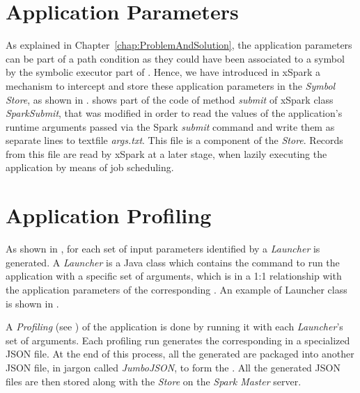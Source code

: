 \section{Application Parameters}\label{sec:application_parameters}
As explained in Chapter~\ref{chap:ProblemAndSolution}, the application parameters can be part of a path condition as they could have been associated to a symbol by the symbolic executor part of \dSymb. Hence, we have introduced in xSpark a mechanism to intercept and store these application parameters in the \tool \textit{Symbol Store}, as shown in .   shows part of the code of method \textit{submit} of xSpark class \textit{SparkSubmit}, that was modified in order to read the values of the application's runtime arguments passed via the Spark \textit{submit} command and write them as separate lines to textfile \textit{args.txt}. This file is a component of the \textit{\model Store}. Records from this file are read by xSpark at a later stage, when lazily executing the application by means of job scheduling.
 


\section{Application Profiling}\label{sec:application_profiling}
As shown in , for each set of input parameters identified by \dSymb a \textit{Launcher} is generated. A \textit{Launcher} is a Java class which contains the command to run the application with a specific set of arguments, which is in a 1:1 relationship with the application parameters of the corresponding \plan. An example of Launcher class is shown in . 

A \textit{Profiling} (see 
) of the application is done by running it with each \textit{Launcher}'s set of arguments. Each profiling run generates the corresponding \plan in a specialized JSON file. At the end of this process, all the generated \plans are packaged into another JSON file, in jargon called \textit{JumboJSON}, to form the \model. All the generated JSON files are then stored along with the \model \textit{Store} on the \textit{Spark Master} server. 



